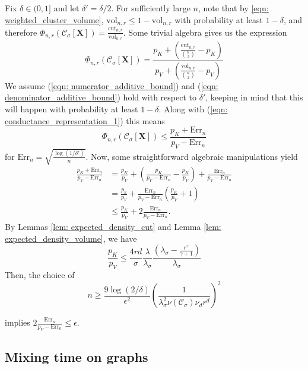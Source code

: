 \documentclass{article}
\newcommand{\vol}{\mathrm{vol}}
\newcommand{\1}{\mathbf{1}}
\newcommand{\Err}{\mathrm{Err}}
\newcommand{\cut}{\mathrm{cut}}
\newcommand{\Xbf}{\mathbf{X}}
\newcommand{\Cset}{\mathcal{C}}
\newcommand{\Csig}{\Cset_{\sigma}}
\theoremstyle{aldenthm}
\begin{document}
Fix $\delta \in (0,1]$ and let $\delta' = \delta/2$. For sufficiently large $n$, note that by \eqref{eqn: weighted_cluster_volume}, $\vol_{n,r} \leq 1 - \vol_{n,r}$ with probability at least $1 - \delta$, and therefore $\Phi_{n,r}(\Csig[\Xbf]) = \frac{\cut_{n,r}}{\vol_{n,r}}$. Some trivial algebra gives us the expression
\begin{equation}
\label{eqn: conductance_representation_1}
\Phi_{n,r}(\Csig[\Xbf]) = \frac{p_K + \left(\frac{\cut_{n,r}}{{n \choose 2}} - p_K\right)}{p_V + \left(\frac{\vol_{n,r}}{{n \choose 2}} - p_V\right)}
\end{equation}
We assume (\ref{eqn: numerator_additive_bound}) and (\ref{eqn: denominator_additive_bound}) hold with respect to $\delta'$, keeping in mind that this will happen with probability at least $1 - \delta$. Along with (\ref{eqn: conductance_representation_1}) this means
\begin{equation*}
\Phi_{n,r}(\Csig[\mathbf{X}]) \leq \frac{p_K + \Err_n}{p_V - \Err_n}
\end{equation*}
for $\Err_n = \sqrt{\frac{\log(1/\delta')}{n}}$.
Now, some straightforward algebraic manipulations yield
\begin{align*}
\frac{p_K + \Err_n}{p_V - \Err_n} & = \frac{p_K}{p_V} + \left(\frac{p_K}{p_V - \Err_n} - \frac{p_K}{p_V}\right) + \frac{\Err_n}{p_V - \Err_n} \\
& = \frac{p_k}{p_V} + \frac{\Err_n}{p_V - \Err_n}\left(\frac{p_K}{p_V} + 1\right) \\
& \leq \frac{p_K}{p_V} + 2 \frac{\Err_n}{p_V - \Err_n}.
\end{align*}
By Lemmas \ref{lem: expected_density_cut} and Lemma \ref{lem: expected_density_volume}, we have
\begin{equation*}
\frac{p_K}{p_V} \leq \frac{4rd}{\sigma} \frac{\lambda}{\lambda_{\sigma}} \frac{\left(\lambda_{\sigma} - \frac{r^{\gamma}}{\gamma + 1}\right)}{\lambda_{\sigma}}
\end{equation*}
Then, the choice of 
\begin{equation*}
n \geq \frac{9\log(2/\delta)}{\epsilon^2}\left(\frac{1}{ \lambda_{\sigma}^2 \nu(\Csig) \nu_d r^d}\right)^2 
\end{equation*}

implies $2 \frac{\Err_n}{p_V - \Err_n} \leq \epsilon$.

\subsection{Mixing time on graphs}
\label{sec: mixing_time_on_graphs}
\end{document}
